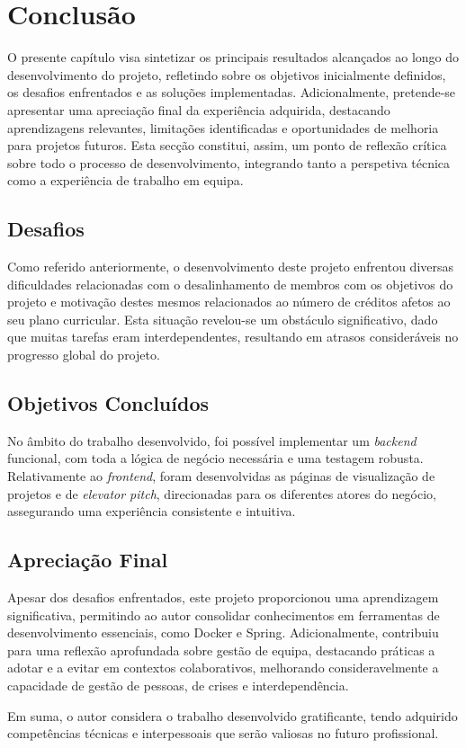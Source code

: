 \chapter{Conclusão}

O presente capítulo visa sintetizar os principais resultados alcançados ao longo do desenvolvimento do projeto, refletindo sobre os objetivos inicialmente definidos, os desafios enfrentados e as soluções implementadas. Adicionalmente, pretende-se apresentar uma apreciação final da experiência adquirida, destacando aprendizagens relevantes, limitações identificadas e oportunidades de melhoria para projetos futuros. Esta secção constitui, assim, um ponto de reflexão crítica sobre todo o processo de desenvolvimento, integrando tanto a perspetiva técnica como a experiência de trabalho em equipa.

\section{Desafios}

Como referido anteriormente, o desenvolvimento deste projeto enfrentou diversas dificuldades relacionadas com o desalinhamento de membros com os objetivos do projeto e motivação destes mesmos relacionados ao número de créditos afetos ao seu plano curricular. Esta situação revelou-se um obstáculo significativo, dado que muitas tarefas eram interdependentes, resultando em atrasos consideráveis no progresso global do projeto.

\section{Objetivos Concluídos}

No âmbito do trabalho desenvolvido, foi possível implementar um \textit{backend} funcional, com toda a lógica de negócio necessária e uma testagem robusta. Relativamente ao \textit{frontend}, foram desenvolvidas as páginas de visualização de projetos e de \textit{elevator pitch}, direcionadas para os diferentes atores do negócio, assegurando uma experiência consistente e intuitiva.

\section{Apreciação Final}

Apesar dos desafios enfrentados, este projeto proporcionou uma aprendizagem significativa, permitindo ao autor consolidar conhecimentos em ferramentas de desenvolvimento essenciais, como \gls{Docker} e \gls{Spring}. Adicionalmente, contribuiu para uma reflexão aprofundada sobre gestão de equipa, destacando práticas a adotar e a evitar em contextos colaborativos, melhorando consideravelmente a capacidade de gestão de pessoas, de crises e interdependência.

Em suma, o autor considera o trabalho desenvolvido gratificante, tendo adquirido competências técnicas e interpessoais que serão valiosas no futuro profissional.
